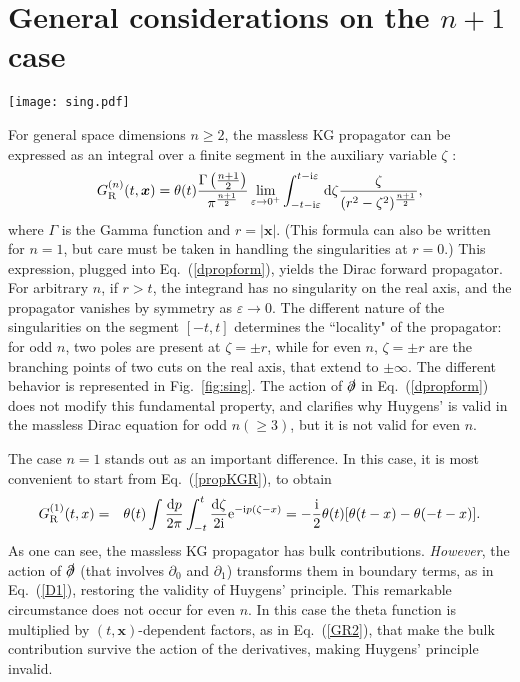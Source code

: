 \section{General considerations on the $n+1$ case}
\label{sec:nplus1}

\begin{figure*}[t]
\centering
\texttt{[image: sing.pdf]}
\caption{Singularities of the propagator on the real axis, for even (top) and odd $n$ (bottom), see Eq.~\eqref{Gzeta}. The arrow in the integration segment (in blue) shows the direction of integration. }
\label{fig:sing}
\end{figure*} 

For general space dimensions $n \geq 2$, the massless KG propagator \label{propKGexpl} can be expressed as an integral over a finite segment in the auxiliary variable $\zeta$ \cite{evans}:
\begin{equation}
\label{Gzeta}
G_\textrm{R}^{(n)} (t,\bm{x}) = 
\theta(t) \frac{\Gamma\left(\frac{n+1}{2}\right)}{\pi^{\frac{n+1}{2}}} \lim_{\varepsilon\to 0^+} \int_{-t-\mathrm{i}\varepsilon}^{t-\mathrm{i}\varepsilon} \mathrm{d}\zeta \frac{\zeta}{(r^2-\zeta^2)^{\frac{n+1}{2}}} ,
\end{equation}
where $\Gamma$ is the Gamma function and $r=|\bm{x}|$. 
(This formula can also be written for $n=1$, but care must be taken in handling the singularities at $r=0$.)
This expression, plugged into Eq.\ (\ref{dpropform}), yields the Dirac forward propagator.
For arbitrary $n$, if $r>t$, the integrand has no singularity on the real axis, and the propagator vanishes by symmetry as $\varepsilon\to 0$. The different nature of the singularities on the segment $[-t,t]$ determines the ``locality" of the propagator: for odd $n$, two poles are present at $\zeta=\pm r$, while for even $n$, $\zeta=\pm r$ are the branching points of two cuts on the real axis, that extend to $\pm\infty$. The different behavior is represented in Fig.~\ref{fig:sing}. 
The action of $\slashed{\partial}$ in Eq.\ (\ref{dpropform}) does not modify this fundamental property, and clarifies why Huygens' is valid in the massless Dirac equation for odd $n (\geq3)$, but it is not valid for even $n$. 

The case $n=1$ stands out as an important difference. In this case, it is most convenient to start from Eq.\ (\ref{propKGR}), to obtain
\begin{eqnarray}
G_\textrm{R}^{(1)} (t,x) &=& 
\theta(t) \int \frac{\mathrm{d} p}{2 \pi}
\int_{-t}^{t} \frac{\mathrm{d}\zeta}{2\mathrm{i}} \mathrm{e}^{-\mathrm{i} p (\zeta-x)} = -\frac{\mathrm{i}}{2} \theta(t) [\theta(t-x) - \theta(-t-x)].
\label{Gzeta1}
\end{eqnarray}
As one can see, the massless KG propagator has bulk contributions. \emph{However}, the action of $\slashed{\partial}$ (that involves $\partial_0$ and $\partial_1$) transforms them in boundary terms, as in Eq.\ (\ref{D1}), restoring the validity of Huygens' principle. This remarkable circumstance does not occur for even $n$. In this case the theta function is multiplied by $(t,\bm{x})$-dependent factors, as in Eq.\ (\ref{GR2}), that make the bulk contribution survive the action of the derivatives, making Huygens' principle invalid.

